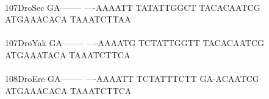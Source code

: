 \documentclass[11pt,twoside,reqno,a4paper]{article}
\begin{document}
{\hspace*{4\charwidth}\hspace*{7\charwidth}\hspace*{1\charwidth}\hspace*{1\charwidth}\hspace*{1\charwidth}\hspace*{1\charwidth}\hspace*{1\charwidth}\hspace*{1\charwidth}\\
107\hspace*{1\charwidth}DroSec	GA--------	----AAAATT	TATATTGGCT	TACACAATCG	ATGAAACACA	TAAATCTTAA	\\
\hspace*{4\charwidth}\hspace*{7\charwidth}\hspace*{1\charwidth}\hspace*{1\charwidth}\hspace*{1\charwidth}\hspace*{1\charwidth}\hspace*{1\charwidth}\hspace*{1\charwidth}\\
107\hspace*{1\charwidth}DroYak	GA--------	----AAAATG	TCTATTGGTT	TACACAATCG	ATGAAATACA	TAAATCTTCA	\\
\hspace*{4\charwidth}\hspace*{7\charwidth}\hspace*{1\charwidth}\hspace*{1\charwidth}\hspace*{1\charwidth}\hspace*{1\charwidth}\hspace*{1\charwidth}\hspace*{1\charwidth}\\
108\hspace*{1\charwidth}DroEre	GA--------	----AAAATT	TCTATTTCTT	GA-ACAATCG	ATGAAACACA	TAAATCTTCA	\\
\hspace*{4\charwidth}\hspace*{7\charwidth}\hspace*{1\charwidth}\hspace*{1\charwidth}\hspace*{1\charwidth}\hspace*{1\charwidth}\hspace*{1\charwidth}\hspace*{1\charwidth}\\
}
\end{document}
